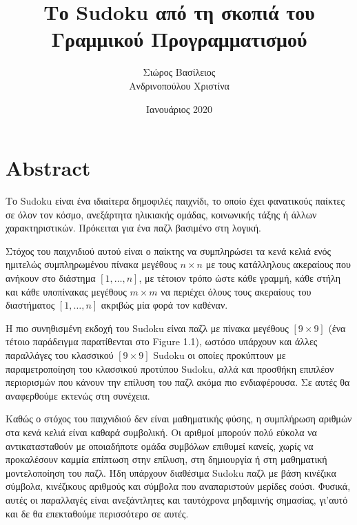 \documentclass[oneside,12pt]{book}
\title{\huge Το Sudoku από τη σκοπιά του\\Γραμμικού Προγραμματισμού}
\author{Σιώρος Βασίλειος\\Ανδρινοπούλου Χριστίνα}
\date{Ιανουάριος 2020}
\theoremstyle{definition}
\begin{document}
\maketitle

\pagebreak

\tableofcontents

\chapter{Abstract}

Το Sudoku είναι ένα ιδιαίτερα δημοφιλές παιχνίδι, το οποίο έχει φανατικούς παίκτες σε όλον τον κόσμο, ανεξάρτητα ηλικιακής ομάδας, κοινωνικής τάξης ή άλλων χαρακτηριστικών. Πρόκειται για ένα παζλ βασιμένο στη λογική. \par

Στόχος του παιχνιδιού αυτού είναι ο παίκτης να συμπληρώσει τα
κενά κελιά ενός ημιτελώς συμπληρωμένου πίνακα μεγέθους
\(n \times n\) με τους κατάλληλους ακεραίους που ανήκουν στο διάστημα \(\left[1,\dots,n \right]\), με τέτοιον τρόπο ώστε κάθε γραμμή, κάθε στήλη και κάθε υποπίνακας μεγέθους \(m \times m\) να περιέχει όλους τους ακεραίους του διαστήματος  \(\left[1,\dots,n \right]\) ακριβώς μία φορά τον καθέναν. \par

Η πιο συνηθισμένη εκδοχή του Sudoku είναι παζλ με πίνακα μεγέθους \(\left[9 \times 9\right]\) (ένα τέτοιο παράδειγμα παρατίθενται στο Figure 1.1), ωστόσο υπάρχουν και άλλες παραλλάγες του κλασσικού \(\left[9 \times 9\right] \) Sudoku οι οποίες προκύπτουν με παραμετροποίηση του κλασσικού προτύπου Sudoku, αλλά και προσθήκη επιπλέον περιορισμών που κάνουν την επίλυση του παζλ ακόμα πιο ενδιαφέρουσα. Σε αυτές θα αναφερθούμε εκτενώς στη συνέχεια. \par

Καθώς ο στόχος του παιχνιδιού δεν είναι μαθηματικής φύσης, η συμπλήρωση αριθμών στα κενά κελιά είναι καθαρά συμβολική. Οι αριθμοί μπορούν πολύ εύκολα να αντικατασταθούν με οποιαδήποτε ομάδα συμβόλων επιθυμεί κανείς, χωρίς να προκαλέσουν καμμία επίπτωση στην επίλυση, στη δημιουργία ή στη μαθηματική μοντελοποίηση του παζλ. Ήδη υπάρχουν διαθέσιμα Sudoku παζλ με βάση κινέζικα σύμβολα, κινέζικους αριθμούς και σύμβολα που αναπαριστούν μερίδες σούσι. Φυσικά, αυτές οι παραλλαγές είναι ανεξάντλητες και ταυτόχρονα μηδαμινής σημασίας, γι'αυτό και δε θα επεκταθούμε περισσότερο σε αυτές.
\end{document}
